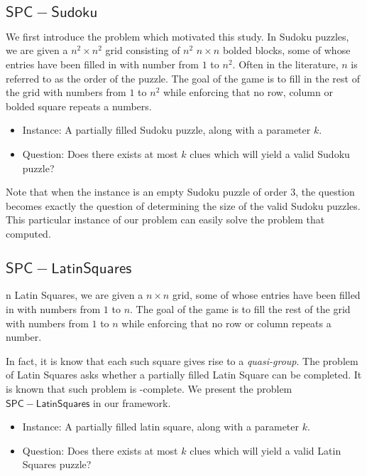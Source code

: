 \documentclass[runningheads,a4paper]{llncs}
\begin{document}
\subsection{$\mathsf{SPC-Sudoku}$}

We first introduce the problem which motivated this study. In Sudoku puzzles, we are given a $n^2 \times n^2$ grid consisting of $n^2$ $n \times n$ bolded blocks, some of whose entries have been filled in with number from $1$ to $n^2$. Often in the literature, $n$ is referred to as the order of the puzzle. The goal of the game is to fill in the rest of the grid with numbers from $1$ to $n^2$ while enforcing that no row, column or bolded square repeats a numbers. 

\begin{itemize}
\item Instance: A partially filled Sudoku puzzle, along with a parameter $k$.
\item Question: Does there exists at most $k$ clues which will yield a valid Sudoku puzzle?
\end{itemize}

Note that when the instance is an empty Sudoku puzzle of order 3, the question becomes exactly the question of determining the size of the valid Sudoku puzzles. This particular instance of our problem can easily solve the problem that \cite{mcguire2012there} computed. 

\subsection{$\mathsf{SPC-LatinSquares}$}

n Latin Squares, we are given a $n \times n$ grid, some of whose entries have been filled in with numbers from $1$ to $n$. The goal of the game is to fill the rest of the grid with numbers from $1$ to $n$ while enforcing that no row or column repeats a number. 

In fact, it is know that each such square gives rise to a \emph{quasi-group}. The problem of Latin Squares asks whether a partially filled Latin Square can be completed. It is known that such problem is \NP-complete. We present the problem $\mathsf{SPC-Latin Squares}$ in our framework.

\begin{itemize}
\item Instance: A partially filled latin square, along with a parameter $k$. 
\item Question: Does there exists at most $k$ clues which will yield a valid Latin Squares puzzle?
\end{itemize}
\end{document}
